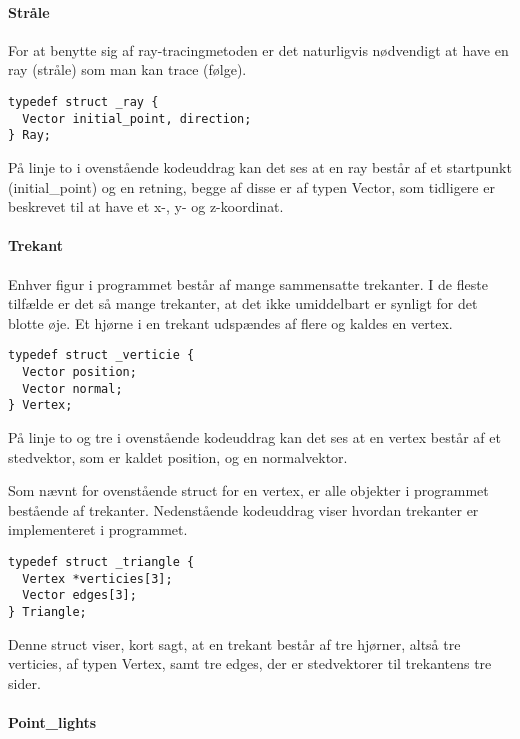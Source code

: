 \paragraph{Stråle}
For at benytte sig af ray-tracingmetoden er det naturligvis nødvendigt at have en ray (stråle) som man kan trace (følge). 

\begin{lstlisting}[style=Cstyle, caption=Struct til ray]
typedef struct _ray {
  Vector initial_point, direction;
} Ray;
\end{lstlisting}

På linje to i ovenstående kodeuddrag kan det ses at en ray består af et startpunkt (initial\_point) og en retning, begge af disse er af typen Vector, som tidligere er beskrevet til at have et x-, y- og z-koordinat.

\paragraph{Trekant}
Enhver figur i programmet består af mange sammensatte trekanter. I de fleste tilfælde er det så mange trekanter, at det ikke umiddelbart er synligt for det blotte øje. Et hjørne i en trekant udspændes af flere og kaldes en vertex.
    
\begin{lstlisting}[style=Cstyle, caption=Struct til vertex]
typedef struct _verticie {
  Vector position;
  Vector normal;
} Vertex;
\end{lstlisting}

På linje to og tre i ovenstående kodeuddrag kan det ses at en vertex består af et stedvektor, som er kaldet position, og en normalvektor.
    
Som nævnt for ovenstående struct for en vertex, er alle objekter i programmet bestående af trekanter. Nedenstående kodeuddrag viser hvordan trekanter er implementeret i programmet.
    
\begin{lstlisting}[style=Cstyle, caption=Struct til triangle]
typedef struct _triangle {
  Vertex *verticies[3];
  Vector edges[3];
} Triangle;
\end{lstlisting}

Denne struct viser, kort sagt, at en trekant består af tre hjørner, altså tre verticies, af typen Vertex, samt tre edges, der er stedvektorer til trekantens tre sider. 

\paragraph{Point\_lights}


